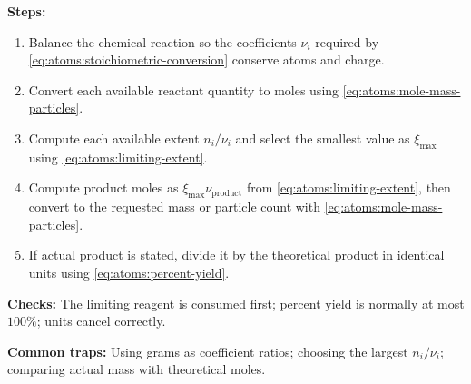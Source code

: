 
\textbf{Steps:}
\begin{enumerate}
    \item Balance the chemical reaction so the coefficients \(\nu_i\) required by \eqref{eq:atoms:stoichiometric-conversion} conserve atoms and charge.
    \item Convert each available reactant quantity to moles using \eqref{eq:atoms:mole-mass-particles}.
    \item Compute each available extent \(n_i/\nu_i\) and select the smallest value as \(\xi_{\max}\) using \eqref{eq:atoms:limiting-extent}.
    \item Compute product moles as \(\xi_{\max}\nu_{\mathrm{product}}\) from \eqref{eq:atoms:limiting-extent}, then convert to the requested mass or particle count with \eqref{eq:atoms:mole-mass-particles}.
    \item If actual product is stated, divide it by the theoretical product in identical units using \eqref{eq:atoms:percent-yield}.
\end{enumerate}

\textbf{Checks:} The limiting reagent is consumed first; percent yield is normally at most \(100\%\); units cancel correctly.

\textbf{Common traps:} Using grams as coefficient ratios; choosing the largest \(n_i/\nu_i\); comparing actual mass with theoretical moles.
